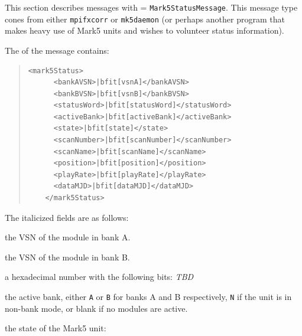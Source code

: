 \begin{description}
This section describes messages with  = {\tt Mark5StatusMessage}.
This message type cones from either {\tt mpifxcorr} or {\tt mk5daemon} (or perhaps another program that makes heavy use of Mark5 units and wishes to volunteer status information).

The  of the message contains:

\begin{quotation}
\begin{Verbatim}[commandchars=\|\[\]]
    <mark5Status>
      <bankAVSN>|bfit[vsnA]</bankAVSN>
      <bankBVSN>|bfit[vsnB]</bankBVSN>
      <statusWord>|bfit[statusWord]</statusWord>
      <activeBank>|bfit[activeBank]</activeBank>
      <state>|bfit[state]</state>
      <scanNumber>|bfit[scanNumber]</scanNumber>
      <scanName>|bfit[scanName]</scanName>
      <position>|bfit[position]</position>
      <playRate>|bfit[playRate]</playRate>
      <dataMJD>|bfit[dataMJD]</dataMJD>
    </mark5Status>
\end{Verbatim}
\end{quotation}

\noindent The italicized fields are as follows:

\begin{description}
\item{} the VSN of the module in bank A.
\item{} the VSN of the module in bank B.
\item{} a hexadecimal number with the following bits:
{\em TBD}
\item{} the active bank, either {\tt A} or {\tt B} for banks A and B respectively, {\tt N} if the unit is in non-bank mode, or blank if no modules are active.
\item{} the state of the Mark5 unit:


\end{description}
\end{description}
